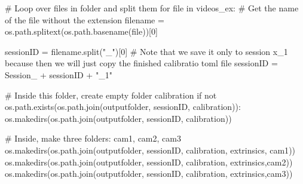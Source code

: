 \documentclass[
  letterpaper,
  DIV=11,
  numbers=noendperiod]{scrreprt}
\newenvironment{Shaded}{\begin{snugshade}}{\end{snugshade}}
\newcommand{\BuiltInTok}[1]{\textcolor[rgb]{0.00,0.23,0.31}{#1}}
\newcommand{\CommentTok}[1]{\textcolor[rgb]{0.37,0.37,0.37}{#1}}
\newcommand{\ControlFlowTok}[1]{\textcolor[rgb]{0.00,0.23,0.31}{#1}}
\newcommand{\DecValTok}[1]{\textcolor[rgb]{0.68,0.00,0.00}{#1}}
\newcommand{\KeywordTok}[1]{\textcolor[rgb]{0.00,0.23,0.31}{#1}}
\newcommand{\NormalTok}[1]{\textcolor[rgb]{0.00,0.23,0.31}{#1}}
\newcommand{\OperatorTok}[1]{\textcolor[rgb]{0.37,0.37,0.37}{#1}}
\newcommand{\StringTok}[1]{\textcolor[rgb]{0.13,0.47,0.30}{#1}}
\begin{document}
\begin{Shaded}
\begin{Highlighting}[]
\CommentTok{\# Loop over files in folder and split them}
\ControlFlowTok{for} \BuiltInTok{file} \KeywordTok{in}\NormalTok{ videos\_ex:}
    \CommentTok{\# Get the name of the file without the extension}
\NormalTok{    filename }\OperatorTok{=}\NormalTok{ os.path.splitext(os.path.basename(}\BuiltInTok{file}\NormalTok{))[}\DecValTok{0}\NormalTok{]}

\NormalTok{    sessionID }\OperatorTok{=}\NormalTok{ filename.split(}\StringTok{"\_"}\NormalTok{)[}\DecValTok{0}\NormalTok{]}
    \CommentTok{\# Note that we save it only to session x\_1 because then we will just copy the finished calibratio toml file}
\NormalTok{    sessionID }\OperatorTok{=} \StringTok{\textquotesingle{}Session\_\textquotesingle{}} \OperatorTok{+}\NormalTok{ sessionID }\OperatorTok{+} \StringTok{"\_1"} 

    \CommentTok{\# Inside this folder, create empty folder \textquotesingle{}calibration\textquotesingle{} }
    \ControlFlowTok{if} \KeywordTok{not}\NormalTok{ os.path.exists(os.path.join(outputfolder, sessionID, }\StringTok{\textquotesingle{}calibration\textquotesingle{}}\NormalTok{)):}
\NormalTok{        os.makedirs(os.path.join(outputfolder, sessionID, }\StringTok{\textquotesingle{}calibration\textquotesingle{}}\NormalTok{))}

    \CommentTok{\# Inside, make three folders: cam1, cam2, cam3}
\NormalTok{    os.makedirs(os.path.join(outputfolder, sessionID, }\StringTok{\textquotesingle{}calibration\textquotesingle{}}\NormalTok{, }\StringTok{\textquotesingle{}extrinsics\textquotesingle{}}\NormalTok{, }\StringTok{\textquotesingle{}cam1\textquotesingle{}}\NormalTok{))}
\NormalTok{    os.makedirs(os.path.join(outputfolder, sessionID, }\StringTok{\textquotesingle{}calibration\textquotesingle{}}\NormalTok{, }\StringTok{\textquotesingle{}extrinsics\textquotesingle{}}\NormalTok{,}\StringTok{\textquotesingle{}cam2\textquotesingle{}}\NormalTok{))}
\NormalTok{    os.makedirs(os.path.join(outputfolder, sessionID, }\StringTok{\textquotesingle{}calibration\textquotesingle{}}\NormalTok{, }\StringTok{\textquotesingle{}extrinsics\textquotesingle{}}\NormalTok{,}\StringTok{\textquotesingle{}cam3\textquotesingle{}}\NormalTok{))}
    

\end{Highlighting}
\end{Shaded}
\end{document}
